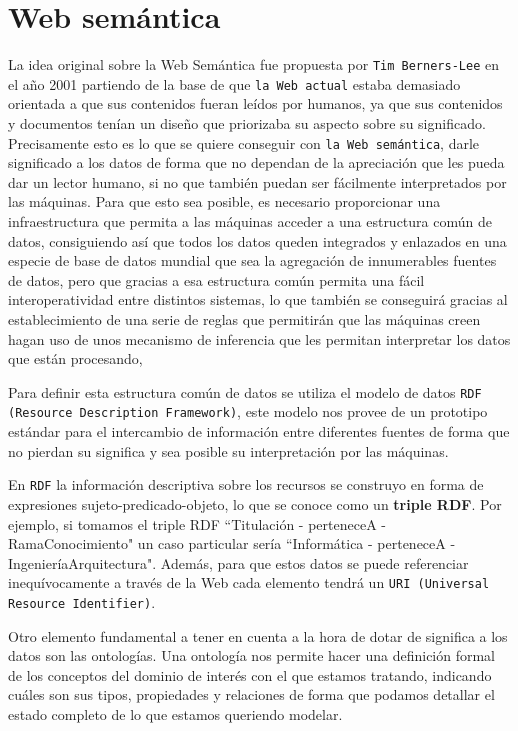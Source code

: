 \section{Web semántica}
La idea original sobre la Web Semántica fue propuesta por {\tt Tim Berners-Lee} en el año 2001 partiendo de la base de que {\tt la Web actual} estaba demasiado orientada a que sus contenidos fueran leídos por humanos, ya que sus contenidos y documentos tenían un diseño que priorizaba su aspecto sobre su significado. Precisamente esto es lo que se quiere conseguir con {\tt la Web semántica}, darle significado a los datos de forma que no dependan de la apreciación que les pueda dar un lector humano, si no que también puedan ser fácilmente interpretados por las máquinas. Para que esto sea posible, es necesario proporcionar una infraestructura que permita a las máquinas acceder a una estructura común de datos, consiguiendo así que todos los datos queden integrados y enlazados en una especie de base de datos mundial que sea la agregación de innumerables fuentes de datos, pero que gracias a esa estructura común permita una fácil interoperatividad entre distintos sistemas, lo que también se conseguirá gracias al establecimiento de una serie de reglas que permitirán que las máquinas creen hagan uso de unos mecanismo de inferencia que les permitan interpretar los datos que están procesando, 

\bigskip
Para definir esta estructura común de datos se utiliza el modelo de datos {\tt RDF (Resource Description Framework)}, este modelo nos provee de un prototipo estándar para el intercambio de información entre diferentes fuentes de forma que no pierdan su significa y sea posible su interpretación por las máquinas. 

\bigskip En {\tt RDF} la información descriptiva sobre los recursos se construyo en forma de expresiones sujeto-predicado-objeto, lo que se conoce como un \textbf{triple RDF}. Por ejemplo, si tomamos el triple RDF ``Titulación - perteneceA - RamaConocimiento" un caso particular sería ``Informática - perteneceA - IngenieríaArquitectura". Además, para que estos datos se puede referenciar inequívocamente a través de la Web cada elemento tendrá un {\tt URI (Universal Resource Identifier)}.

\bigskip

Otro elemento fundamental a tener en cuenta a la hora de dotar de significa a los datos son las ontologías. Una ontología nos permite hacer una definición formal de los conceptos del dominio de interés con el que estamos tratando, indicando cuáles son sus tipos, propiedades y relaciones de forma que podamos detallar el estado completo de lo que estamos queriendo modelar.

